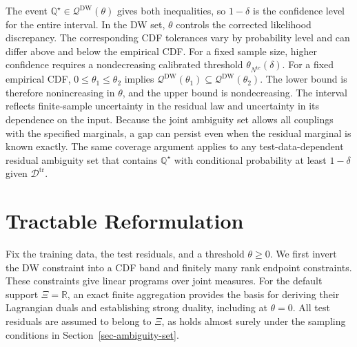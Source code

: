 \documentclass[review,11pt,3p,authoryear,nopreprintline]{elsarticle}
\begin{document}
The event $\mathbb Q^\star\in\mathscr Q^{\mathrm{DW}}(\theta)$ gives both inequalities, so $1-\delta$ is the confidence level for the entire interval. In the DW set, $\theta$ controls the corrected likelihood discrepancy. The corresponding CDF tolerances vary by probability level and can differ above and below the empirical CDF. For a fixed sample size, higher confidence requires a nondecreasing calibrated threshold $\theta_{N^{\mathrm{te}}}(\delta)$. For a fixed empirical CDF, $0\le\theta_1\le\theta_2$ implies $\mathscr Q^{\mathrm{DW}}(\theta_1)\subseteq\mathscr Q^{\mathrm{DW}}(\theta_2)$. The lower bound is therefore nonincreasing in $\theta$, and the upper bound is nondecreasing. The interval reflects finite-sample uncertainty in the residual law and uncertainty in its dependence on the input. Because the joint ambiguity set allows all couplings with the specified marginals, a gap can persist even when the residual marginal is known exactly. The same coverage argument applies to any test-data-dependent residual ambiguity set that contains $\mathbb Q^\star$ with conditional probability at least $1-\delta$ given $\mathcal D^{\mathrm{tr}}$.

\section{Tractable Reformulation}
\label{sec-reformulation}

Fix the training data, the test residuals, and a threshold $\theta\ge0$. We first invert the DW constraint into a CDF band and finitely many rank endpoint constraints. These constraints give linear programs over joint measures. For the default support $\Xi=\mathbb R$, an exact finite aggregation provides the basis for deriving their Lagrangian duals and establishing strong duality, including at $\theta=0$. All test residuals are assumed to belong to $\Xi$, as holds almost surely under the sampling conditions in Section~\ref{sec-ambiguity-set}.
\end{document}
